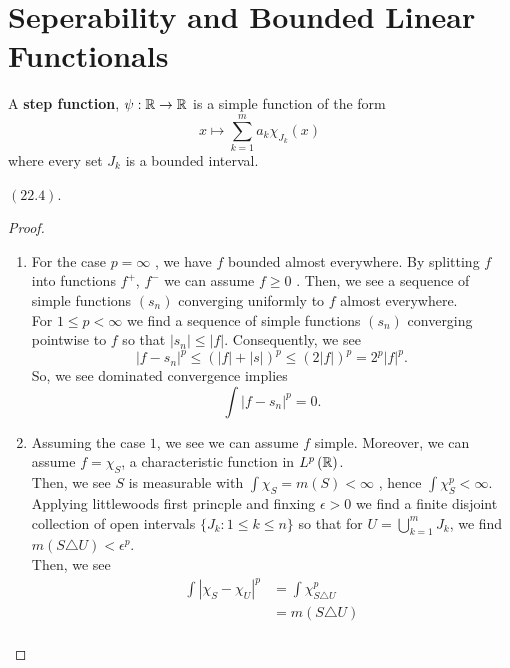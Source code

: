 \section{Seperability and Bounded Linear Functionals}
\begin{definition}
	 A \textbf{step function}, \(\psi: \mathbb{R} \to \mathbb{R}\) 	is a simple function of the form \[
	 x \mapsto \sum_{k=1}^{m} a_{k} \chi_{J_{k}}\left( x \right)
	 \] where every set \(J_{k}\) is a bounded interval.
\end{definition}
\begin{theorem} \(\left( 22.4 \right) \).
\end{theorem}
\begin{proof}
	\begin{enumerate}
		\item For the case \(p = \infty\) , we have \(f\) bounded almost everywhere. By splitting \(f\) into functions \(f^{+}\), \(f^{-}\) we can assume \(f \ge 0\) . Then, we see a sequence of simple functions \(\left( s_{n} \right) \) converging uniformly to \(f\) almost everywhere.\\
			For \(1 \le p < \infty\) we find a sequence of simple functions \(\left( s_{n} \right) \) converging pointwise to \(f\) so that \(\left| s_{n} \right|\le \left| f \right|  \). Consequently, we see \[
			\left| f-s_{n} \right| ^{p} \le (\left| f \right| + \left| s \right|)^{p}  \le ( 2\left| f \right|)^{p}  = 2^{p}\left| f \right| ^{p}
			.\]
			So, we see dominated convergence implies \[
			\int \left| f-s_{n} \right| ^{p} = 0
			.\]
		\item Assuming the case \(1\), we see we can assume \(f\) simple. Moreover, we can assume \(f = \chi_{S}\), a characteristic function in \(L^{p}\left( \mathbb{R} \right) \).\\
			Then, we see \(S \) is measurable with \(\int \chi_{S} = m\left( S \right) < \infty\) , hence \(\int \chi_{S}^{p} < \infty\). Applying littlewoods first princple and finxing \(\epsilon > 0\) we find a finite disjoint collection of open intervals \(\{J_{k} : 1\le k \le n\} \) so that for \(U = \bigcup_{k=1} ^{m}J_{k}\), we find \(m\left( S\triangle U \right) < \epsilon^{p}\).\\
			Then, we see
			\begin{align*}
				\int\left| \chi_{S} - \chi_{U} \right| ^{p} &=  \int \chi_{S \triangle U} ^{p}\\
				&= m\left( S\triangle U \right)  \\

\end{align*}
\end{enumerate}
\end{proof}
